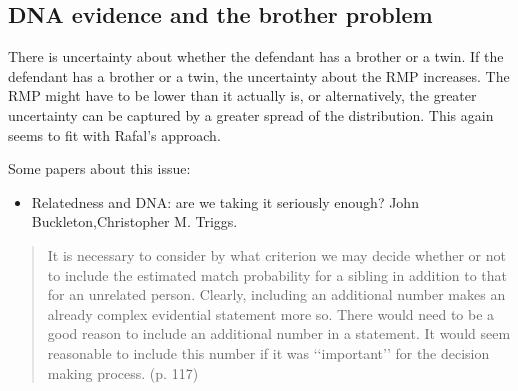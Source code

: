 \documentclass[
  10pt,
  dvipsnames,enabledeprecatedfontcommands]{scrartcl}
\providecommand{\tightlist}{%
  \setlength{\itemsep}{0pt}\setlength{\parskip}{0pt}}
\begin{document}
\hypertarget{dna-evidence-and-the-brother-problem}{%
\subsection{DNA evidence and the brother
problem}\label{dna-evidence-and-the-brother-problem}}

There is uncertainty about whether the defendant has a brother or a
twin. If the defendant has a brother or a twin, the uncertainty about
the RMP increases. The RMP might have to be lower than it actually is,
or alternatively, the greater uncertainty can be captured by a greater
spread of the distribution. This again seems to fit with Rafal's
approach.



Some papers about this issue:

\begin{itemize}
\tightlist
\item
  Relatedness and DNA: are we taking it seriously enough? John
  Buckleton,Christopher M. Triggs.
\end{itemize}

\begin{quote}
 It is necessary to consider by what criterion we may
decide whether or not to include the estimated match
probability for a sibling in addition to that for an unrelated
person. Clearly, including an additional number makes an
already complex evidential statement more so. There would
need to be a good reason to include an additional number
in a statement. It would seem reasonable to include
this number if it was ‘‘important’’ for the decision making
process. (p. 117)
\end{quote}

\end{document}
